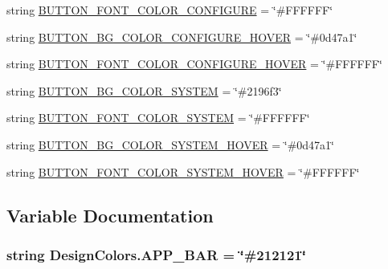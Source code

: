 \begin{DoxyCompactItemize}
\item 
string \hyperlink{namespaceDesignColors_a8e04a09a7ec6ea1fa3a1dd41fead1792}{B\+U\+T\+T\+O\+N\+\_\+\+F\+O\+N\+T\+\_\+\+C\+O\+L\+O\+R\+\_\+\+C\+O\+N\+F\+I\+G\+U\+RE} = \char`\"{}\#F\+F\+F\+F\+FF\char`\"{}
\item 
string \hyperlink{namespaceDesignColors_a3e85bd38c64bb5b93ae8b5b99f3181df}{B\+U\+T\+T\+O\+N\+\_\+\+B\+G\+\_\+\+C\+O\+L\+O\+R\+\_\+\+C\+O\+N\+F\+I\+G\+U\+R\+E\+\_\+\+H\+O\+V\+ER} = \char`\"{}\#0d47a1\char`\"{}
\item 
string \hyperlink{namespaceDesignColors_a0248738a62963aa5da01e082c3c04a48}{B\+U\+T\+T\+O\+N\+\_\+\+F\+O\+N\+T\+\_\+\+C\+O\+L\+O\+R\+\_\+\+C\+O\+N\+F\+I\+G\+U\+R\+E\+\_\+\+H\+O\+V\+ER} = \char`\"{}\#F\+F\+F\+F\+FF\char`\"{}
\item 
string \hyperlink{namespaceDesignColors_a5924d34438819b719af59a08f1002d90}{B\+U\+T\+T\+O\+N\+\_\+\+B\+G\+\_\+\+C\+O\+L\+O\+R\+\_\+\+S\+Y\+S\+T\+EM} = \char`\"{}\#2196f3\char`\"{}
\item 
string \hyperlink{namespaceDesignColors_abd5b7c8c991d968b7fdc9232feef7b0b}{B\+U\+T\+T\+O\+N\+\_\+\+F\+O\+N\+T\+\_\+\+C\+O\+L\+O\+R\+\_\+\+S\+Y\+S\+T\+EM} = \char`\"{}\#F\+F\+F\+F\+FF\char`\"{}
\item 
string \hyperlink{namespaceDesignColors_ae1ef4f0181280dee35dc33e253d1df84}{B\+U\+T\+T\+O\+N\+\_\+\+B\+G\+\_\+\+C\+O\+L\+O\+R\+\_\+\+S\+Y\+S\+T\+E\+M\+\_\+\+H\+O\+V\+ER} = \char`\"{}\#0d47a1\char`\"{}
\item 
string \hyperlink{namespaceDesignColors_a7b473b0f7a1e94ba117b66725bd28d78}{B\+U\+T\+T\+O\+N\+\_\+\+F\+O\+N\+T\+\_\+\+C\+O\+L\+O\+R\+\_\+\+S\+Y\+S\+T\+E\+M\+\_\+\+H\+O\+V\+ER} = \char`\"{}\#F\+F\+F\+F\+FF\char`\"{}
\end{DoxyCompactItemize}


\subsection{Variable Documentation}
\subsubsection[{\texorpdfstring{A\+P\+P\+\_\+\+B\+AR}{APP_BAR}}]{\setlength{\rightskip}{0pt plus 5cm}string Design\+Colors.\+A\+P\+P\+\_\+\+B\+AR = \char`\"{}\#212121\char`\"{}}\hypertarget{namespaceDesignColors_a5b302c557da5bbd6922d98db4e9aeafd}{}\label{namespaceDesignColors_a5b302c557da5bbd6922d98db4e9aeafd}
